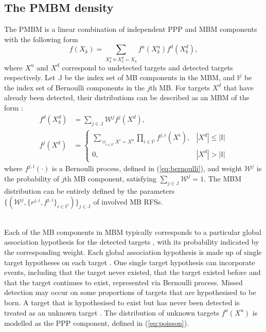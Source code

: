 \subsection{The PMBM density}
The PMBM is a linear combination of independent PPP and MBM components with the following form
\begin{equation}
    f(X_k) = \sum_{X_k^u\uplus X_k^d=X_k}f^{u}(X_k^u)f^{d}(X_k^d),
\label{eq:pmbm}
\end{equation}
where $X^u$ and $X^d$ correspond to undetected targets and detected targets respectively. Let $\mathbb{J}$ be the index set of MB components in the MBM, and $\mathbb{I}^j$ be the index set of Bernoulli components in the $j$th MB. For targets $X^d$ that have already been detected, their distributions can be described as an MBM of the form \cite{pmbmextended2}:
\begin{subequations}
\begin{align}
    f^{d}(X^d_k) &= \sum_{j\in\mathbb{J}}\mathcal{W}^jf^j(X^d),\\
    f^j(X^d) &= \begin{cases}
\sum_{\uplus_{i\in\mathbb{I}^j}X^i=X^d}\prod_{i\in\mathbb{I}^j}f^{j,i}(X^i), & |X^d| \leq |\mathbb{I}| \\
0, & |X^d| > |\mathbb{I}|
\end{cases}
\end{align}
\label{eq:mbm}
\end{subequations}
where $f^{j,i}(\cdot)$ is a Bernoulli process, defined in (\ref{eq:bernoulli}), and weight $\mathcal{W}^j$ is the probability of $j$th MB component, satisfying $\sum_{j\in\mathbb{J}}\mathcal{W}^j = 1$. The MBM distribution can be entirely defined by the parameters $\{(\mathcal{W}^j,\{r^{j,i},f^{j,i}\}_{i\in\mathbb{I}^j})\}_{j\in\mathbb{J}}$ of involved MB RFSs. 


~\\
Each of the MB components in MBM typically corresponds to a particular global association hypothesis for the detected targets \cite{pmbmpoint}, with its probability indicated by the corresponding weight. Each global association hypothesis is made up of single target hypotheses on each target \cite{pmbmpoint}. One single target hypothesis can incorporate events, including that the target never existed, that the target existed before and that the target continues to exist, represented via Bernoulli process. Missed detection may occur on some proportions of targets that are hypothesised to be born. A target that is hypothesised to exist but has never been detected is treated as an unknown target \cite{pmbmpoint}. The distribution of unknown targets $f^u(X^u)$ is modelled as the PPP component, defined in (\ref{eq:poisson}). 

